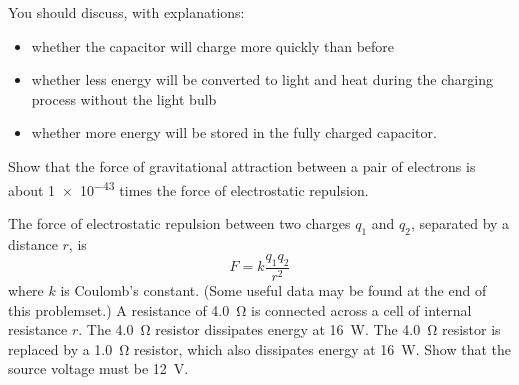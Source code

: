 \documentclass[a4paper]{exam}
\begin{document}
\begin{questions}
\begin{parts}
            You should discuss, with explanations:
            \begin{itemize}
              \item whether the capacitor will charge more quickly than before
              \item whether less energy will be converted to light and heat during the charging process without the light bulb
              \item whether more energy will be stored in the fully charged capacitor.
            \end{itemize}
    \end{parts}
  \question Show that the force of gravitational attraction between a pair of electrons is about \num{1e-43} times the force of electrostatic repulsion.

            The force of electrostatic repulsion between two charges $ q_1 $ and $ q_2 $, separated by a distance $ r $, is
            \begin{displaymath}
              F = k\frac{q_1 q_2}{r^2}
            \end{displaymath}
            where $ k $ is Coulomb's constant. (Some useful data may be found at the end of this problemset.)
  \question A resistance of \SI{4.0}{\ohm} is connected across a cell of internal resistance $ r $. The \SI{4.0}{\ohm} resistor
            dissipates energy at \SI{16}{\watt}. The \SI{4.0}{\ohm} resistor is replaced by a \SI{1.0}{\ohm} resistor, which
            also dissipates energy at \SI{16}{\watt}. Show that the source voltage must be \SI{12}{\volt}.
  \question
\end{questions}
\end{document}
